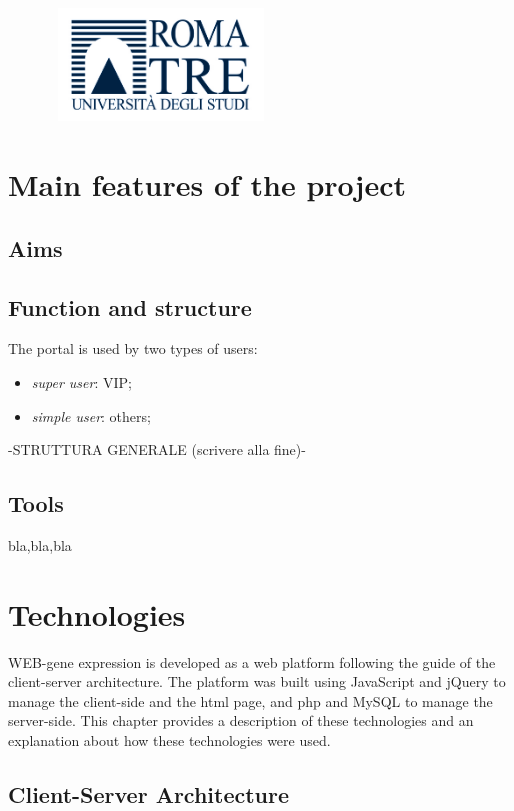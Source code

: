 \documentclass[a4paper]{report}
\begin{document}
\begin{figure}[hb]
\centering
\includegraphics[height=3cm, width=6cm]{logoRomaTre.jpg}
\end{figure}

\chapter{Main features of the project}
\section{Aims}


\section{Function and structure}
The portal is used by two types of users:
\begin{itemize}
   \item \textit{super user}: VIP;
   \item \textit{simple user}: others;
\end{itemize}

-STRUTTURA GENERALE (scrivere alla fine)-


\section{Tools}
bla,bla,bla



\chapter{Technologies}
WEB-gene expression is developed as a web platform following the guide of the client-server architecture. The platform was built using JavaScript and jQuery to manage the client-side and the html page, and php and MySQL to manage the server-side. This chapter provides a description of these technologies and an explanation about how these technologies were used.

\section{Client-Server Architecture}
\end{document}

